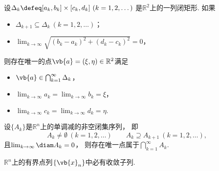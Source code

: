 \begin{theorem}[闭矩形套定理]
设\(\Delta_k \defeq [a_k,b_k]\times[c_k,d_k]\ (k=1,2,\dotsc)\)
是\(\mathbb{R}^2\)上的一列闭矩形.
如果\begin{itemize}
	\item \(\Delta_{k+1} \subseteq \Delta_k\ (k=1,2,\dotsc)\)；
	\item \(\lim_{k\to\infty} \sqrt{(b_k-a_k)^2+(d_k-c_k)^2} = 0\)，
\end{itemize}
则存在唯一的点\(\vb{a}=(\xi,\eta)\in\mathbb{R}^2\)满足\begin{itemize}
	\item \(\vb{a}\in\bigcap_{k=1}^\infty \Delta_k\)，
	\item \(\lim_{k\to\infty} a_k = \lim_{k\to\infty} b_k = \xi\)，
	\item \(\lim_{k\to\infty} c_k = \lim_{k\to\infty} d_k = \eta\).
\end{itemize}
\end{theorem}
\begin{theorem}
设\(\{A_k\}\)是\(\mathbb{R}^n\)上的单调减的非空闭集序列，
即\[
	A_k\neq\emptyset\ (k=1,2,\dotsc)
	\qquad
	A_k \supseteq A_{k+1}\ (k=1,2,\dotsc),
\]
且\(\lim_{k\to\infty} \diam A_k = 0\)，
则存在唯一点属于\(\bigcap_{k=1}^\infty A_k\).
\end{theorem}

\begin{theorem}
\(\mathbb{R}^n\)上的有界点列\(\{\vb{x}_n\}\)中必有收敛子列.
\end{theorem}

